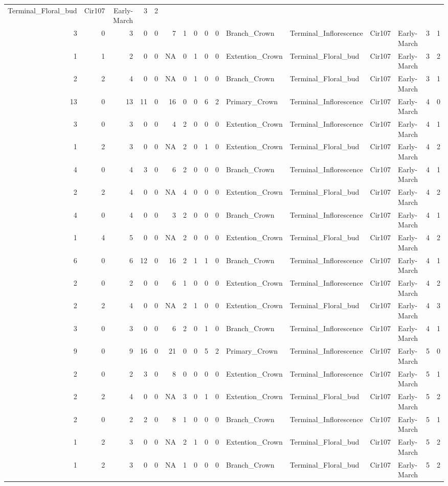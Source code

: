 \documentclass[]{article}
\begin{document}
\begin{longtable}[]{@{}rrrrrrrrrrllllrl@{}}
Terminal\_Floral\_bud & Cir107 & Early-March & 3 & 2\tabularnewline
3 & 0 & 3 & 0 & 0 & 7 & 1 & 0 & 0 & 0 & Branch\_Crown &
Terminal\_Inflorescence & Cir107 & Early-March & 3 & 1\tabularnewline
1 & 1 & 2 & 0 & 0 & NA & 0 & 1 & 0 & 0 & Extention\_Crown &
Terminal\_Floral\_bud & Cir107 & Early-March & 3 & 2\tabularnewline
2 & 2 & 4 & 0 & 0 & NA & 0 & 1 & 0 & 0 & Branch\_Crown &
Terminal\_Floral\_bud & Cir107 & Early-March & 3 & 1\tabularnewline
13 & 0 & 13 & 11 & 0 & 16 & 0 & 0 & 6 & 2 & Primary\_Crown &
Terminal\_Inflorescence & Cir107 & Early-March & 4 & 0\tabularnewline
3 & 0 & 3 & 0 & 0 & 4 & 2 & 0 & 0 & 0 & Extention\_Crown &
Terminal\_Inflorescence & Cir107 & Early-March & 4 & 1\tabularnewline
1 & 2 & 3 & 0 & 0 & NA & 2 & 0 & 1 & 0 & Extention\_Crown &
Terminal\_Floral\_bud & Cir107 & Early-March & 4 & 2\tabularnewline
4 & 0 & 4 & 3 & 0 & 6 & 2 & 0 & 0 & 0 & Branch\_Crown &
Terminal\_Inflorescence & Cir107 & Early-March & 4 & 1\tabularnewline
2 & 2 & 4 & 0 & 0 & NA & 4 & 0 & 0 & 0 & Extention\_Crown &
Terminal\_Floral\_bud & Cir107 & Early-March & 4 & 2\tabularnewline
4 & 0 & 4 & 0 & 0 & 3 & 2 & 0 & 0 & 0 & Branch\_Crown &
Terminal\_Inflorescence & Cir107 & Early-March & 4 & 1\tabularnewline
1 & 4 & 5 & 0 & 0 & NA & 2 & 0 & 0 & 0 & Extention\_Crown &
Terminal\_Floral\_bud & Cir107 & Early-March & 4 & 2\tabularnewline
6 & 0 & 6 & 12 & 0 & 16 & 2 & 1 & 1 & 0 & Branch\_Crown &
Terminal\_Inflorescence & Cir107 & Early-March & 4 & 1\tabularnewline
2 & 0 & 2 & 0 & 0 & 6 & 1 & 0 & 0 & 0 & Extention\_Crown &
Terminal\_Inflorescence & Cir107 & Early-March & 4 & 2\tabularnewline
2 & 2 & 4 & 0 & 0 & NA & 2 & 1 & 0 & 0 & Extention\_Crown &
Terminal\_Floral\_bud & Cir107 & Early-March & 4 & 3\tabularnewline
3 & 0 & 3 & 0 & 0 & 6 & 2 & 0 & 1 & 0 & Branch\_Crown &
Terminal\_Inflorescence & Cir107 & Early-March & 4 & 1\tabularnewline
9 & 0 & 9 & 16 & 0 & 21 & 0 & 0 & 5 & 2 & Primary\_Crown &
Terminal\_Inflorescence & Cir107 & Early-March & 5 & 0\tabularnewline
2 & 0 & 2 & 3 & 0 & 8 & 0 & 0 & 0 & 0 & Extention\_Crown &
Terminal\_Inflorescence & Cir107 & Early-March & 5 & 1\tabularnewline
2 & 2 & 4 & 0 & 0 & NA & 3 & 0 & 1 & 0 & Extention\_Crown &
Terminal\_Floral\_bud & Cir107 & Early-March & 5 & 2\tabularnewline
2 & 0 & 2 & 2 & 0 & 8 & 1 & 0 & 0 & 0 & Branch\_Crown &
Terminal\_Inflorescence & Cir107 & Early-March & 5 & 1\tabularnewline
1 & 2 & 3 & 0 & 0 & NA & 2 & 1 & 0 & 0 & Extention\_Crown &
Terminal\_Floral\_bud & Cir107 & Early-March & 5 & 2\tabularnewline
1 & 2 & 3 & 0 & 0 & NA & 1 & 0 & 0 & 0 & Branch\_Crown &
Terminal\_Floral\_bud & Cir107 & Early-March & 5 & 2\tabularnewline

\end{longtable}
\end{document}
